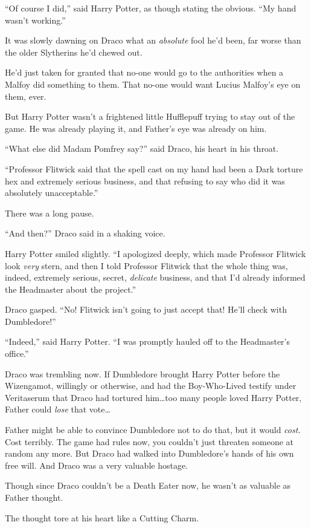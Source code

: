“Of course I did,” said Harry Potter, as though stating the obvious. “My hand wasn’t working.”

It was slowly dawning on Draco what an \emph{absolute} fool he’d been, far worse than the older Slytherins he’d chewed out.

He’d just taken for granted that no-one would go to the authorities when a Malfoy did something to them. That no-one would want Lucius Malfoy’s eye on them, ever.

But Harry Potter wasn’t a frightened little Hufflepuff trying to stay out of the game. He was already playing it, and Father’s eye was already on him.

“What else did Madam Pomfrey say?” said Draco, his heart in his throat.

“Professor Flitwick said that the spell cast on my hand had been a Dark torture hex and extremely serious business, and that refusing to say who did it was absolutely unacceptable.”

There was a long pause.

“And then?” Draco said in a shaking voice.

Harry Potter smiled slightly. “I apologized deeply, which made Professor Flitwick look \emph{very} stern, and then I told Professor Flitwick that the whole thing was, indeed, extremely serious, secret, \emph{delicate} business, and that I’d already informed the Headmaster about the project.”

Draco gasped. “No! Flitwick isn’t going to just accept that! He’ll check with Dumbledore!”

“Indeed,” said Harry Potter. “I was promptly hauled off to the Headmaster’s office.”

Draco was trembling now. If Dumbledore brought Harry Potter before the Wizengamot, willingly or otherwise, and had the Boy-Who-Lived testify under Veritaserum that Draco had tortured him…too many people loved Harry Potter, Father could \emph{lose} that vote…

Father might be able to convince Dumbledore not to do that, but it would \emph{cost.} Cost terribly. The game had rules now, you couldn’t just threaten someone at random any more. But Draco had walked into Dumbledore’s hands of his own free will. And Draco was a very valuable hostage.

Though since Draco couldn’t be a Death Eater now, he wasn’t as valuable as Father thought.

The thought tore at his heart like a Cutting Charm.

